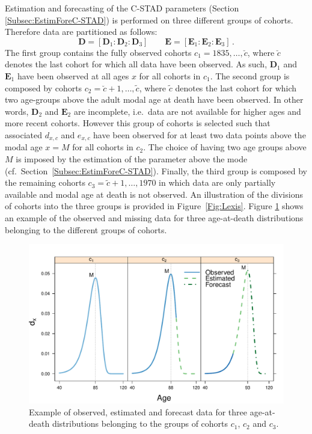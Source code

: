 \documentclass[11pt, a4paper]{article}
\begin{document}
Estimation and forecasting of the C-STAD parameters (Section \ref{Subsec:EstimForeC-STAD}) is performed on three different groups of cohorts. Therefore data are partitioned as follows:
\begin{equation}\label{eq:DataDiv}
\bm{D} = \left[ \bm{D}_{1} : \bm{D}_{2} : \bm{D}_{3}\right] \qquad \bm{E} = \left[ \bm{E}_{1} : \bm{E}_{2} : \bm{E}_{3}\right] \, .
\end{equation}
The first group contains the fully observed cohorts $c_1 =1835,\ldots,\breve{c}$, where $\breve{c}$ denotes the last cohort for which all data have been observed. As such, $\bm{D}_{1}$ and $\bm{E}_{1}$ have been observed at all ages $x$ for all cohorts in $c_1$. The second group is composed by cohorts $c_2 =\breve{c}+1, \ldots, \tilde{c}$, where $\tilde{c}$ denotes the last cohort for which two age-groups above the adult modal age at death have been observed. In other words, $\bm{D}_{2}$ and $\bm{E}_{2}$ are incomplete, i.e.~data are not available for higher ages and more recent cohorts. However this group of cohorts is selected such that associated $d_{x,c}$ and $e_{x,c}$ have been observed for at least two data points above the modal age $x=M$ for all cohorts in $c_2$. The choice of having two age groups above $M$ is imposed by the estimation of the parameter above the mode (cf.~Section~\ref{Subsec:EstimForeC-STAD}). Finally, the third group is composed by the remaining cohorts $c_3 =\tilde{c}+1, \ldots, 1970$ in which data are only partially available and modal age at death is not observed. An illustration of the divisions of cohorts into the three groups is provided in Figure~\ref{Fig:Lexis}. Figure \ref{Fig:DxExample} shows an example of the observed and missing data for three age-at-death distributions belonging to the different groups of cohorts. 

\begin{figure}[t]
	\begin{center}
		\includegraphics[scale=0.7]{./Figures/F3.pdf} 
		\caption{Example of observed, estimated and forecast data for three age-at-death distributions belonging to the groups of cohorts $c_1$, $c_2$ and $c_3$.\label{Fig:DxExample} }    
	\end{center}
\end{figure}
\end{document}
